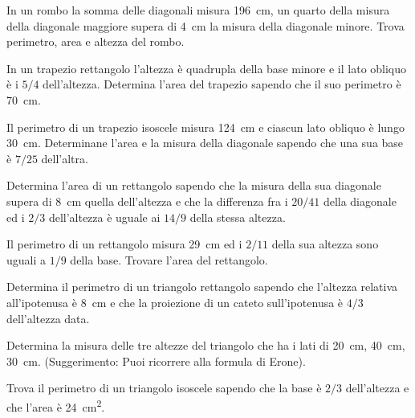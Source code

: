 \begin{multicols}{2}
\begin{esercizio}
\label{ese:7.64}
In un rombo la somma delle diagonali misura 196~cm, un quarto della 
misura della diagonale maggiore supera di 4~cm la misura della 
diagonale minore. Trova perimetro, area e altezza del rombo.
\end{esercizio}

\begin{esercizio}
\label{ese:7.65}
In un trapezio rettangolo l'altezza è quadrupla della base minore e 
il lato obliquo è i $5/4$ dell'altezza. Determina l'area del trapezio 
sapendo che il suo perimetro è 70~cm.
\end{esercizio}

\begin{esercizio}
\label{ese:7.66}
Il perimetro di un trapezio isoscele misura 124~cm e ciascun lato 
obliquo è lungo 30~cm. Determinane l'area e la misura della diagonale 
sapendo che una sua base è $7/25$ dell'altra.
\end{esercizio}

\begin{esercizio}
\label{ese:7.67}
Determina l'area di un rettangolo sapendo che la misura della sua 
diagonale supera di 8~cm quella dell'altezza e che la differenza fra 
i $20/41$ della diagonale ed i $2/3$ dell'altezza è uguale ai $14/9$ 
della stessa altezza.
\end{esercizio}

\begin{esercizio}
\label{ese:7.69}
Il perimetro di un rettangolo misura 29~cm ed i $2/11$ della sua 
altezza sono uguali a $1/9$ della base. Trovare l'area del rettangolo.
\end{esercizio}

\begin{esercizio}
\label{ese:7.77}
Determina il perimetro di un triangolo rettangolo sapendo che 
l'altezza relativa all'ipotenusa è 8~cm e che la proiezione di un 
cateto sull'ipotenusa è $4/3$ dell'altezza data.
\end{esercizio}

\begin{esercizio}
\label{ese:7.78}
Determina la misura delle tre altezze del triangolo che ha i lati di 
20~cm, 40~cm, 30~cm. (Suggerimento: Puoi ricorrere alla formula di 
Erone).
\end{esercizio}

\begin{esercizio}
\label{ese:7.80}
Trova il perimetro di un triangolo isoscele sapendo che la base è 
$2/3$ dell'altezza e che l'area è 24~cm\textsuperscript{2}.
\end{esercizio}


\end{multicols}
